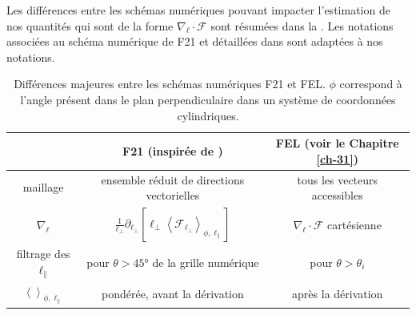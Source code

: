Les différences entre les schémas numériques pouvant impacter l'estimation de nos quantités qui sont de la forme $\nabla _{\boldsymbol{\ell}} \cdot  \boldsymbol{\mathcal{F}}$ sont résumées dans la . Les notations associées au schéma numérique de \ac{F21} et détaillées dans \cite{ferrand_multi-scale_2021} sont adaptées à nos notations. 
 \begin{table}[!ht]
\begin{center}
\begin{tabular}{ c|c|c } 
 & F21 (inspirée de \cite{taylor_recovering_2003}) & FEL (voir le Chapitre \ref{ch-31})\\
\hline
maillage & ensemble réduit de directions vectorielles & tous les vecteurs accessibles \\
$\nabla_{\boldsymbol{\ell}}$ & $\frac{1}{\ell_{\perp}} \partial_{\ell_{\perp}} \left[\ell_{\perp} \left<\mathcal{F}_{\ell_{\perp}}\right>_{\phi, \ell_{\parallel}}\right]$ & $\nabla_{\boldsymbol{\ell}} \cdot \boldsymbol{\mathcal{F}}$ cartésienne \\
filtrage des $\ell_{\parallel}$ & pour $\theta > \ang{45} $ de la grille numérique & pour $\theta > \theta_i$ \\
$\left<\right>_{\phi,\ell_{\parallel}}$ & pondérée, avant la dérivation & après la dérivation 
\end{tabular}
\caption{Différences majeures entre les schémas numériques \ac{F21} et \ac{FEL}. $\phi$ correspond à l'angle présent dans le plan perpendiculaire dans un système de coordonnées cylindriques. \label{tab:compa_F21-FEL}}
\end{center}
\end{table}

